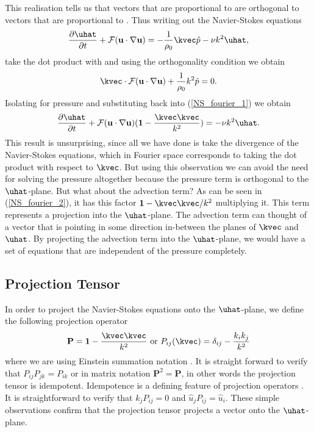 This realisation tells us that vectors that are proportional to \uhatm are orthogonal to vectors that are proportional to \kvecm. Thus writing out the Navier-Stokes equations
\begin{align}
\frac{\partial \uhat}{\partial t} + \mathcal{F}(\textbf{u}\cdot\nabla\textbf{u}) = -\frac{1}{\rho_{0}} \kvec\hat{p} - \nu k^{2}\uhat\label{NS_fourier_1},
\end{align}
take the dot product with \kvecm and using the orthogonality condition we obtain
\begin{align}
\kvec\cdot\mathcal{F}(\textbf{u}\cdot\nabla\textbf{u}) + \frac{1}{\rho_{0}}k^{2}\hat{p}=0\label{pressure_fourier_1}.
\end{align}
Isolating for pressure and substituting back into (\ref{NS_fourier_1}) we obtain
\begin{align}
\frac{\partial \uhat}{\partial t} + \mathcal{F}(\textbf{u}\cdot\nabla\textbf{u})(\textbf{1}-\frac{\kvec\kvec}{k^{2}})= - \nu k^{2}\uhat\label{NS_fourier_2}.
\end{align}
This result is unsurprising, since all we have done is take the divergence of the Navier-Stokes equations, which in Fourier space corresponds to taking the dot product with respect to $\kvec$. But using this observation we can avoid the need for solving the pressure altogether because the pressure term is orthogonal to the $\uhat$-plane. But what about the advection term? As can be seen in (\ref{NS_fourier_2}), it has this factor $\textbf{1} - \kvec\kvec/k^{2}$ multiplying it. This term represents a projection into the $\uhat$-plane. The advection term can thought of a vector that is pointing in some direction in-between the planes of $\kvec$ and $\uhat$. By projecting the advection term into the $\uhat$-plane, we would have a set of equations that are independent of the pressure completely.

\subsection{Projection Tensor}
In order to project the Navier-Stokes equations onto the $\uhat$-plane, we define the following projection operator
\begin{align}
\textbf{P}=\textbf{1} - \frac{\kvec\kvec}{k^{2}} \text{ or } P_{ij}(\kvec) = \delta_{ij} - \frac{k_{i}k_{j}}{k^{2}}
\end{align}
where we are using Einstein summation notation \cite{lesieur,wald}. It is straight forward to verify that $P_{ij}P_{jk}=P_{ik}$ or in matrix notation $\textbf{P}^{2}=\textbf{P}$, in other words the projection tensor is idempotent. Idempotence is a defining feature of projection operators \cite{MeyerLinAlg}. It is straightforward to verify that $k_{j}P_{ij}=0$ and $\hat{u}_{j}P_{ij}=\hat{u}_{i}$. These simple observations confirm that the projection tensor projects a vector onto the $\uhat$-plane. 

